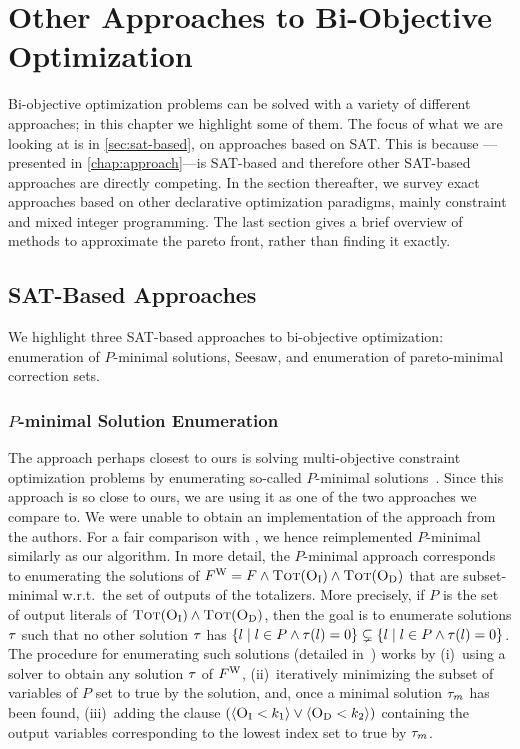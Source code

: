 \chapter{Other Approaches to Bi-Objective Optimization\label{chap:approaches}}

Bi-objective optimization problems can be solved with a variety of different approaches;
in this chapter we highlight some of them.
The focus of what we are looking at is in \cref{sec:sat-based}, on approaches based on SAT.
This is because \algname{}---presented in \cref{chap:approach}---is SAT-based and therefore other SAT-based approaches are directly competing.
In the section thereafter, we survey exact approaches based on other declarative optimization paradigms, mainly constraint and mixed integer programming.
The last section gives a brief overview of methods to approximate the pareto front, rather than finding it exactly.

\section{SAT-Based Approaches\label{sec:sat-based}}

We highlight three SAT-based approaches to bi-objective optimization:
enumeration of $P$-minimal solutions, Seesaw, and enumeration of pareto-minimal correction sets.

\subsection{$P$-minimal Solution Enumeration\label{sec:p-minimal}}

The approach perhaps closest to ours is solving multi-objective constraint optimization problems by enumerating so-called $P$-minimal solutions~\autocite{DBLP:conf/cp/SohBTB17,DBLP:conf/ftp/KoshimuraNFH09}.
Since this approach is so close to ours, we are using it as one of the two approaches we compare \algname{} to.
We were unable to obtain an implementation of the approach from the authors.
For a fair comparison with \algname{}, we hence reimplemented $P$-minimal similarly as our algorithm.
In more detail, the $P$-minimal approach  corresponds to enumerating the solutions of $F^\text{W} = F \land \textsc{Tot}(\textsc{O}_{\text{I}}) \land \textsc{Tot}(\textsc{O}_{\text{D}})$ that are subset-minimal w.r.t.\ the set of outputs of the totalizers.
More precisely, if $P$ is the set of output literals of $\textsc{Tot}(\textsc{O}_{\text{I}}) \land \textsc{Tot}(\textsc{O}_{\text{D}})$, then the goal is to enumerate solutions $\tau$ such that no other solution $\tau$ has $\{ l \mid l \in P \land \tau(l) = 0\} \subsetneq \{ l \mid l \in P \land \tau(l) = 0\}$.
The procedure for enumerating such solutions (detailed in~\textcite{DBLP:conf/ftp/KoshimuraNFH09}) works by (i)~using a solver to obtain any solution $\tau$ of $F^\text{W}$, (ii)~iteratively minimizing the subset of variables of $P$ set to true by the solution, and, once a minimal solution $\tau_m$ has been found, (iii)~adding the clause $(\langle \textsc{O}_{\text{I}} < k_1 \rangle \lor \langle \textsc{O}_{\text{D}} < k_2 \rangle)$ containing the output variables corresponding to the lowest index set to true by $\tau_m$.

